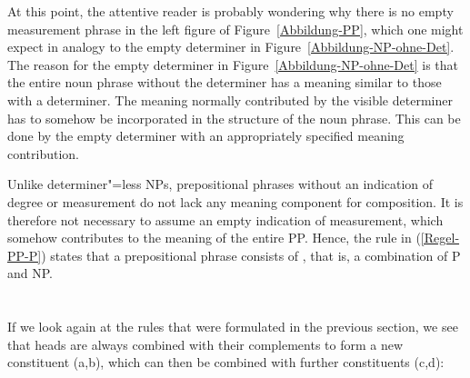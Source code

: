 At this point, the attentive reader is probably wondering why there is no empty measurement phrase in
the left figure of Figure~\ref{Abbildung-PP}, which one might expect in analogy to the empty determiner in Figure~\ref{Abbildung-NP-ohne-Det}.
The reason for the empty determiner in Figure~\ref{Abbildung-NP-ohne-Det} is that the entire noun phrase
without the determiner has a meaning similar to those with a determiner. The meaning normally contributed
by the visible determiner has to somehow be incorporated in the structure of the noun phrase. This
can be done by the empty determiner with an appropriately specified meaning contribution.

Unlike determiner"=less NPs, prepositional phrases without an indication of degree or measurement do
not lack any meaning component for composition. It is therefore not necessary to assume an empty indication of measurement, which
somehow contributes to the meaning of the entire PP. Hence, the rule in (\ref{Regel-PP-P}) states that a
prepositional phrase consists of \pbar, that is, a combination of P and NP.

\section{\xbart}
\label{sec-xbar}

If  we look again at the rules that were formulated in the previous section, we see that heads are always 
combined with their complements to form a new constituent (a,b), which can then be combined with further constituents (c,d):

